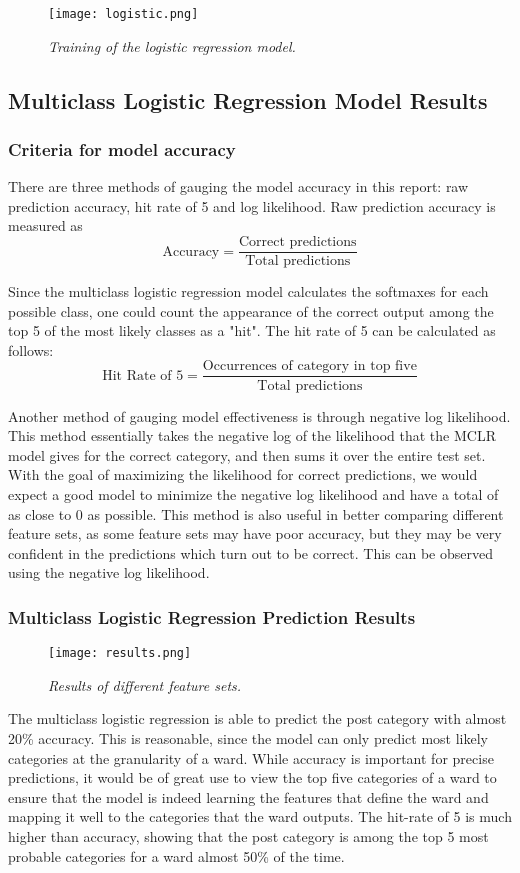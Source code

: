 \documentclass[12pt]{article}
\begin{document}
\begin{figure}[h]
\centering
\texttt{[image: logistic.png]}
\caption{\textit{Training of the logistic regression model.}}
\end{figure}

\subsection{Multiclass Logistic Regression Model Results}
\subsubsection{Criteria for model accuracy}
There are three methods of gauging the model accuracy in this report: raw prediction accuracy, hit rate of 5 and log likelihood. Raw prediction accuracy is measured as 
\[\text{Accuracy} = \frac{\text{Correct predictions}}{\text{Total predictions}}\]

Since the multiclass logistic regression model calculates the softmaxes for each possible class, one could count the appearance of the correct output among the top 5 of the most likely classes as a "hit". The hit rate of 5 can be calculated as follows:
\[\text{Hit Rate of 5} = \frac{\text{Occurrences of category in top five}}{\text{Total predictions}}\]

Another method of gauging model effectiveness is through negative log likelihood. This method essentially takes the negative log of the likelihood that the MCLR model gives for the correct category, and then sums it over the entire test set. With the goal of maximizing the likelihood for correct predictions, we would expect a good model to minimize the negative log likelihood and have a total of as close to 0 as possible. This method is also useful in better comparing different feature sets, as some feature sets may have poor accuracy, but they may be very confident in the predictions which turn out to be correct. This can be observed using the negative log likelihood.

\subsubsection{Multiclass Logistic Regression Prediction Results} 
\begin{figure}[h]
\centering
\texttt{[image: results.png]}
\caption{\textit{Results of different feature sets.}}
\end{figure}
The multiclass logistic regression is able to predict the post category with almost 20\% accuracy. This is reasonable, since the model can only predict most likely categories at the granularity of a ward. 
While accuracy is important for precise predictions, it would be of great use to view the top five categories of a ward to ensure that the model is indeed learning the features that define the ward and mapping it well to the categories that the ward outputs. The hit-rate of 5 is much higher than accuracy, showing that the post category is among the top 5 most probable categories for a ward almost 50\% of the time. 
\end{document}

